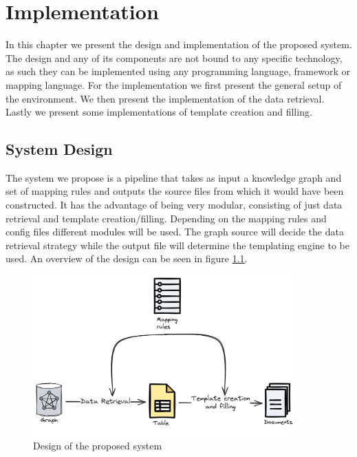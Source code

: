 \chapter{Implementation}
\label{chapter:implementation}
In this chapter we present the design and implementation of the proposed system. The design and any of its components are not bound to any specific technology, as such they can be implemented using any programming language, framework or mapping language. For the implementation we first present the general setup of the environment. We then present the implementation of the data retrieval. Lastly we present some implementations of template creation and filling.

\section{System Design}
The system we propose is a pipeline that takes as input a knowledge graph and set of mapping rules and outputs the source files from which it would have been constructed. It has the advantage of being very modular, consisting of just data retrieval and template creation/filling. Depending on the mapping rules and config files different modules will be used. The graph source will decide the data retrieval strategy while the output file will determine the templating engine to be used. An overview of the design can be seen in figure \ref{fig:design}.

\begin{figure}
    \centering
    \includegraphics[width=0.9\textwidth]{fig/design.png}
    \caption{Design of the proposed system}
    \label{fig:design}   
\end{figure}


